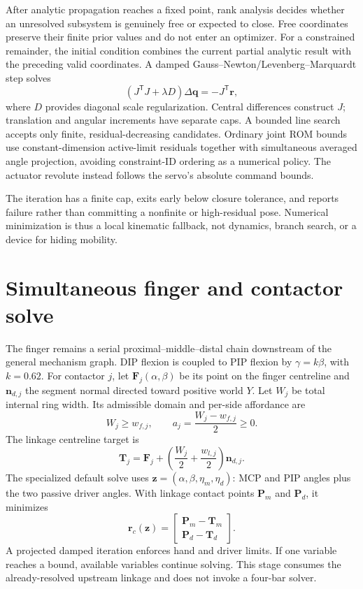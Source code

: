 \documentclass[11pt]{article}
\begin{document}
After analytic propagation reaches a fixed point, rank analysis decides whether
an unresolved subsystem is genuinely free or expected to close. Free
coordinates preserve their finite prior values and do not enter an optimizer.
For a constrained remainder, the initial condition combines the current partial
analytic result with the preceding valid coordinates. A damped
Gauss--Newton/Levenberg--Marquardt step solves
\begin{equation}
  \left(J^{\mathsf T}J+\lambda D\right)\Delta\mathbf{q}
  =-J^{\mathsf T}\mathbf{r},
  \label{eq:damped-step}
\end{equation}
where $D$ provides diagonal scale regularization. Central differences construct
$J$; translation and angular increments have separate caps. A bounded line
search accepts only finite, residual-decreasing candidates. Ordinary joint ROM
bounds use constant-dimension active-limit residuals together with simultaneous
averaged angle projection, avoiding constraint-ID ordering as a numerical
policy. The actuator revolute instead follows the servo's absolute command
bounds.

The iteration has a finite cap, exits early below closure tolerance, and reports
failure rather than committing a nonfinite or high-residual pose. Numerical
minimization is thus a local kinematic fallback, not dynamics, branch search, or
a device for hiding mobility.

\section{Simultaneous finger and contactor solve}

The finger remains a serial proximal--middle--distal chain downstream of the
general mechanism graph. DIP flexion is coupled to PIP flexion by
$\gamma=k\beta$, with $k=0.62$. For contactor $j$, let
$\mathbf{F}_j(\alpha,\beta)$ be its point on the finger centreline and
$\mathbf{n}_{d,j}$ the segment normal directed toward positive world $Y$. Let
$W_j$ be total internal ring width. Its admissible domain and per-side
affordance are
\begin{equation}
  W_j\geq w_{f,j},\qquad a_j=\frac{W_j-w_{f,j}}{2}\geq0.
\end{equation}
The linkage centreline target is
\begin{equation}
  \mathbf{T}_j=\mathbf{F}_j+
  \left(\frac{W_j}{2}+\frac{w_{l,j}}{2}\right)\mathbf{n}_{d,j}.
\end{equation}
The specialized default solve uses
$\mathbf{z}=(\alpha,\beta,\eta_m,\eta_d)$: MCP and PIP angles plus the two
passive driver angles. With linkage contact points $\mathbf{P}_m$ and
$\mathbf{P}_d$, it minimizes
\begin{equation}
  \mathbf{r}_c(\mathbf{z})=
  \begin{bmatrix}
    \mathbf{P}_m-\mathbf{T}_m\\
    \mathbf{P}_d-\mathbf{T}_d
  \end{bmatrix}.
\end{equation}
A projected damped iteration enforces hand and driver limits. If one variable
reaches a bound, available variables continue solving. This stage consumes the
already-resolved upstream linkage and does not invoke a four-bar solver.
\end{document}

